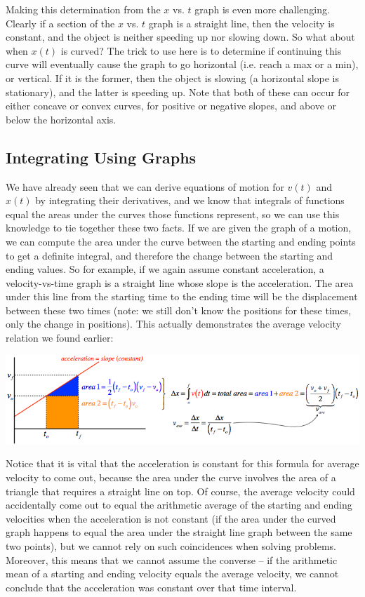 \documentclass[12pt,addpoints]{exam}
\begin{document}
	Making this determination from the $x$ vs. $t$ graph is even more challenging. Clearly if a section of the $x$ vs. $t$ graph is a straight line, then the velocity is constant, and the object is neither speeding up nor slowing down. So what about when $x(t)$ is curved? The trick to use here is to determine if continuing this curve will eventually cause the graph to go horizontal (i.e. reach a max or a min), or vertical. If it is the former, then the object is slowing (a horizontal slope is stationary), and the latter is speeding up. Note that both of these can occur for either concave or convex curves, for positive or negative slopes, and above or below the horizontal axis.
	\begin{center}
		\subsection*{Integrating Using Graphs}
	\end{center}	
	We have already seen that we can derive equations of motion for $v(t)$
	and  $x(t)$ by integrating their derivatives, and we know that integrals of functions equal the areas under the curves those functions represent, so we can use this knowledge to tie together these two facts. If we are given the graph of a motion, we can compute the area under the curve between the starting and ending points to get a definite integral, and therefore the change between the starting and ending values. So for example, if we again assume constant acceleration, a velocity-vs-time graph is a straight line whose slope is the acceleration. The area under this line from the starting time to the ending time will be the displacement between these two times (note: we still don’t know the positions for these times, only the change in positions). This actually demonstrates the average velocity relation we found earlier: \\
	\begin{center}
		\includegraphics[scale=0.85]{int.png}
	\end{center}
	Notice that it is vital that the acceleration is constant for this formula for average velocity to come out, because the area under the curve involves the area of a triangle that requires a straight line on top. Of course, the average velocity could accidentally come out to equal the arithmetic average of the starting and ending velocities when the acceleration is not constant (if the area under the curved graph happens to equal the area under the straight line graph between the same two points), but we cannot rely on such coincidences when solving problems. Moreover, this means that we cannot assume the converse – if the arithmetic mean of a starting and ending velocity equals the average velocity, we cannot conclude that the acceleration was constant over that time interval.
\end{document}
